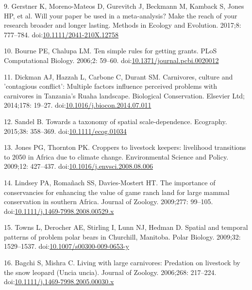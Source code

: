 \documentclass[10pt,letterpaper]{article}
\begin{document}
\hypertarget{ref-Gerstner2017}{}
9. Gerstner K, Moreno-Mateos D, Gurevitch J, Beckmann M, Kamback S,
Jones HP, et al. Will your paper be used in a meta-analysis? Make the
reach of your research broader and longer lasting. Methods in Ecology
and Evolution. 2017;8: 777--784.
doi:\href{https://doi.org/10.1111/2041-210X.12758}{10.1111/2041-210X.12758}

\hypertarget{ref-Bourne2006}{}
10. Bourne PE, Chalupa LM. Ten simple rules for getting grants. PLoS
Computational Biology. 2006;2: 59--60.
doi:\href{https://doi.org/10.1371/journal.pcbi.0020012}{10.1371/journal.pcbi.0020012}

\hypertarget{ref-Dickman2014}{}
11. Dickman AJ, Hazzah L, Carbone C, Durant SM. Carnivores, culture and
'contagious conflict': Multiple factors influence perceived problems
with carnivores in Tanzania's Ruaha landscape. Biological Conservation.
Elsevier Ltd; 2014;178: 19--27.
doi:\href{https://doi.org/10.1016/j.biocon.2014.07.011}{10.1016/j.biocon.2014.07.011}

\hypertarget{ref-Sandel2015}{}
12. Sandel B. Towards a taxonomy of spatial scale-dependence. Ecography.
2015;38: 358--369.
doi:\href{https://doi.org/10.1111/ecog.01034}{10.1111/ecog.01034}

\hypertarget{ref-Jones2009}{}
13. Jones PG, Thornton PK. Croppers to livestock keepers: livelihood
transitions to 2050 in Africa due to climate change. Environmental
Science and Policy. 2009;12: 427--437.
doi:\href{https://doi.org/10.1016/j.envsci.2008.08.006}{10.1016/j.envsci.2008.08.006}

\hypertarget{ref-Lindsey2009}{}
14. Lindsey PA, Romañach SS, Davies-Mostert HT. The importance of
conservancies for enhancing the value of game ranch land for large
mammal conservation in southern Africa. Journal of Zoology. 2009;277:
99--105.
doi:\href{https://doi.org/10.1111/j.1469-7998.2008.00529.x}{10.1111/j.1469-7998.2008.00529.x}

\hypertarget{ref-Towns2009}{}
15. Towns L, Derocher AE, Stirling I, Lunn NJ, Hedman D. Spatial and
temporal patterns of problem polar bears in Churchill, Manitoba. Polar
Biology. 2009;32: 1529--1537.
doi:\href{https://doi.org/10.1007/s00300-009-0653-y}{10.1007/s00300-009-0653-y}

\hypertarget{ref-Bagchi2006}{}
16. Bagchi S, Mishra C. Living with large carnivores: Predation on
livestock by the snow leopard (Uncia uncia). Journal of Zoology.
2006;268: 217--224.
doi:\href{https://doi.org/10.1111/j.1469-7998.2005.00030.x}{10.1111/j.1469-7998.2005.00030.x}
\end{document}
